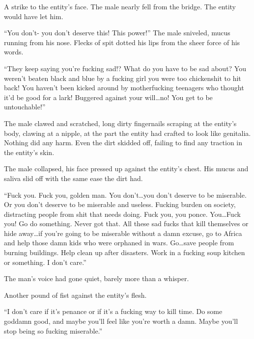 A strike to the entity's face.  The male nearly fell from the bridge.  The entity would have let him.



``You don't- you don't deserve this!  This power!''  The male sniveled, mucus running from his nose.  Flecks of spit dotted his lips from the sheer force of his words.



``They keep saying you're fucking sad!?  What do you have to be sad about?  You weren't beaten black and blue by a fucking girl you were too chickenshit to hit back!  You haven't been kicked around by motherfucking teenagers who thought it'd be good for a lark!  Buggered against your will\ldots no!  You get to be untouchable!''



The male clawed and scratched, long dirty fingernails scraping at the entity's body, clawing at a nipple, at the part the entity had crafted to look like genitalia.  Nothing did any harm.  Even the dirt skidded off, failing to find any traction in the entity's skin.



The male collapsed, his face pressed up against the entity's chest.  His mucus and saliva slid off with the same ease the dirt had.



``Fuck you.  Fuck you, golden man.  You don't\ldots you don't deserve to be miserable.  Or you don't deserve to be miserable and useless.  Fucking burden on society, distracting people from shit that needs doing.  Fuck you, you ponce.  You\ldots Fuck you!  Go do something.  Never got that.  All these sad fucks that kill themselves or hide away\ldots if you're going to be miserable without a damn excuse, go to Africa and help those damn kids who were orphaned in wars.  Go\ldots save people from burning buildings.  Help clean up after disasters.  Work in a fucking soup kitchen or something.  I don't care.''



The man's voice had gone quiet, barely more than a whisper.



Another pound of fist against the entity's flesh.



``I don't care if it's penance or if it's a fucking way to kill time.  Do some goddamn good, and maybe you'll feel like you're worth a damn.  Maybe you'll stop being so fucking miserable.''



